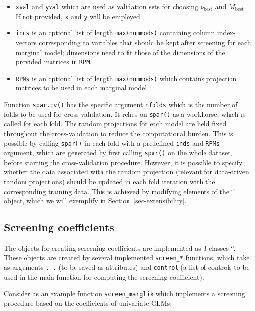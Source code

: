 \documentclass[
  article]{jss}
\newcommand{\class}[1]{`\code{#1}'}
\begin{document}
\begin{itemize}
\item
  \texttt{xval} and \texttt{yval} which are used as validation sets for
  choosing \(\nu_\text{best}\) and \(M_\text{best}\). If not provided,
  \texttt{x} and \texttt{y} will be employed.
\item
  \texttt{inds} is an optional list of length \texttt{max(nummods)}
  containing column index-vectors corresponding to variables that should
  be kept after screening for each marginal model; dimensions need to
  fit those of the dimensions of the provided matrices in \texttt{RPM}.
\item
  \texttt{RPMs} is an optional list of length \texttt{max(nummods)}
  which contains projection matrices to be used in each marginal model.
\end{itemize}

Function \texttt{spar.cv()} has the specific argument \texttt{nfolds}
which is the number of folds to be used for cross-validation. It relies
on \texttt{spar()} as a workhorse, which is called for each fold. The
random projections for each model are held fixed throughout the
cross-validation to reduce the computational burden. This is possible by
calling \texttt{spar()} in each fold with a predefined \texttt{inds} and
\texttt{RPMs} argument, which are generated by first calling
\texttt{spar()} on the whole dataset, before starting the
cross-validation procedure. However, it is possible to specify whether
the data associated with the random projection (relevant for data-driven
random projections) should be updated in each fold iteration with the
corresponding training data. This is achieved by modifying elements of
the \class{randomprojection} object, which we will exemplify in
Section~\ref{sec-extensibility}.

\subsection{Screening coefficients}\label{screening-coefficients}

The objects for creating screening coefficients are implemented as
3 classes \class{screencoef}. These objects are created by
several implemented \texttt{screen\_*} functions, which take as
arguments \texttt{...} (to be saved as attributes) and \texttt{control}
(a list of controls to be used in the main function for computing the
screening coefficient).

Consider as an example function \texttt{screen\_marglik} which
implements a screening procedure based on the coefficients of univariate
GLMs:
\end{document}
